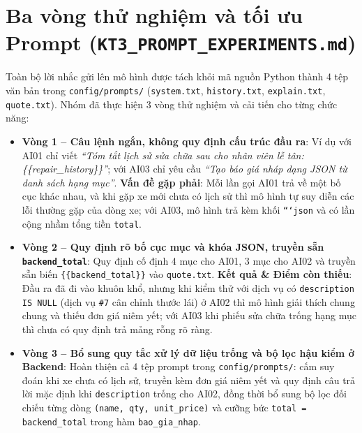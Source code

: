 \section{Ba vòng thử nghiệm và tối ưu Prompt (\texttt{KT3\_PROMPT\_EXPERIMENTS.md})}

Toàn bộ lời nhắc gửi lên mô hình được tách khỏi mã nguồn Python thành 4 tệp văn bản trong \texttt{config/prompts/} (\texttt{system.txt}, \texttt{history.txt}, \texttt{explain.txt}, \texttt{quote.txt}). Nhóm đã thực hiện 3 vòng thử nghiệm và cải tiến cho từng chức năng:

\begin{itemize}[noitemsep,topsep=2pt]
  \item \textbf{Vòng 1 -- Câu lệnh ngắn, không quy định cấu trúc đầu ra}:
  Ví dụ với AI01 chỉ viết \textit{“Tóm tắt lịch sử sửa chữa sau cho nhân viên lễ tân: \{\{repair\_history\}\}”}; với AI03 chỉ yêu cầu \textit{“Tạo báo giá nháp dạng JSON từ danh sách hạng mục”}.
  \textbf{Vấn đề gặp phải}: Mỗi lần gọi AI01 trả về một bố cục khác nhau, và khi gặp xe mới chưa có lịch sử thì mô hình tự suy diễn các lỗi thường gặp của dòng xe; với AI03, mô hình trả kèm khối \texttt{```json} và có lần cộng nhầm tổng tiền \texttt{total}.
  \item \textbf{Vòng 2 -- Quy định rõ bố cục mục và khóa JSON, truyền sẵn \texttt{backend\_total}}:
  Quy định cố định 4 mục cho AI01, 3 mục cho AI02 và truyền sẵn biến \texttt{\{\{backend\_total\}\}} vào \texttt{quote.txt}.
  \textbf{Kết quả \& Điểm còn thiếu}: Đầu ra đã đi vào khuôn khổ, nhưng khi kiểm thử với dịch vụ có \texttt{description IS NULL} (dịch vụ \texttt{\#7} cân chỉnh thước lái) ở AI02 thì mô hình giải thích chung chung và thiếu đơn giá niêm yết; với AI03 khi phiếu sửa chữa trống hạng mục thì chưa có quy định trả mảng rỗng rõ ràng.
  \item \textbf{Vòng 3 -- Bổ sung quy tắc xử lý dữ liệu trống và bộ lọc hậu kiểm ở Backend}:
  Hoàn thiện cả 4 tệp prompt trong \texttt{config/prompts/}: cấm suy đoán khi xe chưa có lịch sử, truyền kèm đơn giá niêm yết và quy định câu trả lời mặc định khi \texttt{description} trống cho AI02, đồng thời bổ sung bộ lọc đối chiếu từng dòng \texttt{(name, qty, unit\_price)} và cưỡng bức \texttt{total = backend\_total} trong hàm \texttt{bao\_gia\_nhap}.
\end{itemize}

